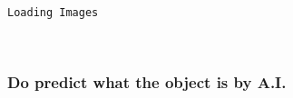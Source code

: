 \documentclass[11pt]{article}
\begin{document}
    \begin{Verbatim}[commandchars=\\\{\}]
Loading Images

    \end{Verbatim}

    \begin{center}
    \end{center}
    { \hspace*{\fill} \\}
    
    \subsubsection{Do predict what the object is by
A.I.}\label{do-predict-what-the-object-is-by-a.i.}
\end{document}
